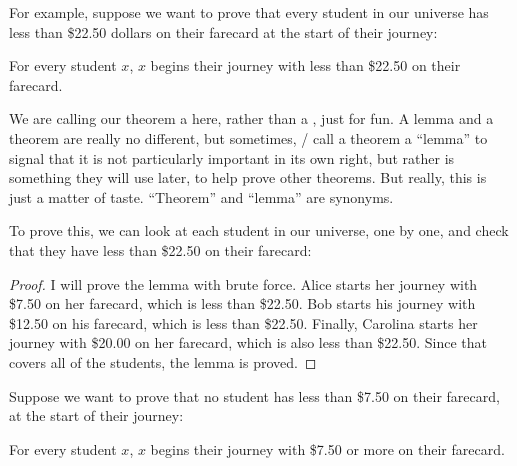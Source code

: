 \documentclass[../../../main.tex]{subfiles}
\begin{document}
For example, suppose we want to prove that every student in our universe has less than \$22.50 dollars on their farecard at the start of their journey:

\begin{framed}
  \begin{lemma}
    \label{lemma:less-than-twenty-two-fifty-on-farecard}
    For every student $x$, $x$ begins their journey with less than \$22.50 on their farecard.
  \end{lemma}
\end{framed}

\begin{aside}
  \begin{remark}
    We are calling our theorem a  here, rather than a , just for fun. A lemma and a theorem are really no different, but sometimes, \mathers/ call a theorem a ``lemma'' to signal that it is not particularly important in its own right, but rather is something they will use later, to help prove other theorems. But really, this is just a matter of taste. ``Theorem'' and ``lemma'' are synonyms.
  \end{remark}
\end{aside}

To prove this, we can look at each student in our universe, one by one, and check that they have less than \$22.50 on their farecard:

\begin{framed}
  \begin{proof}
    I will prove the lemma with brute force. Alice starts her journey with \$7.50 on her farecard, which is less than \$22.50. Bob starts his journey with \$12.50 on his farecard, which is less than \$22.50. Finally, Carolina starts her journey with \$20.00 on her farecard, which is also less than \$22.50. Since that covers all of the students, the lemma is proved.
  \end{proof}
\end{framed}

Suppose we want to prove that no student has less than \$7.50 on their farecard, at the start of their journey:

\begin{framed}
  \begin{lemma}
    \label{lemma:more-than-seven-fifty-on-farecard}
    For every student $x$, $x$ begins their journey with \$7.50 or more on their farecard.
  \end{lemma}
\end{framed}
\end{document}
